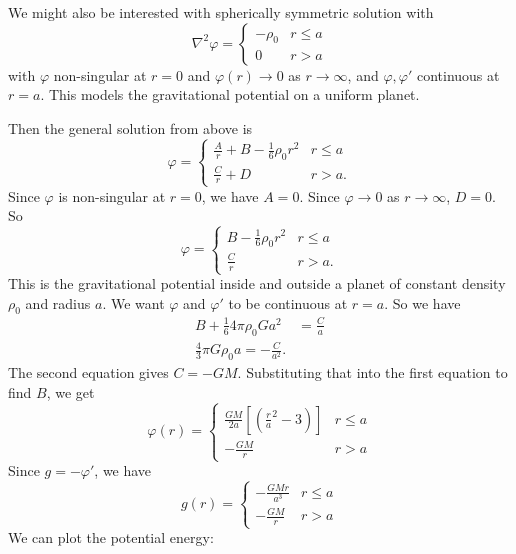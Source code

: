 \documentclass[a4paper]{article}
\begin{document}
\begin{eg}
  We might also be interested with spherically symmetric solution with
  \[
    \nabla^2 \varphi =
    \begin{cases}
      -\rho_0 & r \leq a\\
      0 & r > a
    \end{cases}
  \]
  with $\varphi$ non-singular at $r = 0$ and $\varphi(r) \to 0$ as $r\to \infty$, and $\varphi, \varphi'$ continuous at $r = a$. This models the gravitational potential on a uniform planet.

  Then the general solution from above is
  \[
    \varphi =
    \begin{cases}
      \frac{A}{r} + B - \frac{1}{6}\rho_0 r^2 & r \leq a\\
      \frac{C}{r} + D & r > a.
    \end{cases}
  \]
  Since $\varphi$ is non-singular at $r = 0$, we have $A = 0$. Since $\varphi \to 0$ as $r\to \infty$, $D = 0$. So
  \[
    \varphi =
    \begin{cases}
      B - \frac{1}{6}\rho_0 r^2 & r \leq a\\
      \frac{C}{r} & r > a.
    \end{cases}
  \]
  This is the gravitational potential inside and outside a planet of constant density $\rho_0$ and radius $a$.
  We want $\varphi$ and $\varphi'$ to be continuous at $r = a$. So we have
  \begin{align*}
    B + \frac{1}{6}4\pi \rho_0 Ga^2 &= \frac{C}{a}\\
    \frac{4}{3}\pi G\rho_0 a = -\frac{C}{a^2}.
  \end{align*}
  The second equation gives $C = -GM$. Substituting that into the first equation to find $B$, we get
  \[
    \varphi (r) =
    \begin{cases}
      \frac{GM}{2a}\left[\left(\frac{r}{a}^2 - 3\right)\right] & r \leq a\\
      -\frac{GM}{r} & r > a
    \end{cases}
  \]
  Since $g = -\varphi'$, we have
  \[
    g(r) =
    \begin{cases}
      -\frac{GMr}{a^3}& r \leq a\\
      -\frac{GM}{r} & r > a
    \end{cases}
  \]
  We can plot the potential energy:
  \begin{center}
\end{center}
\end{eg}
\end{document}
